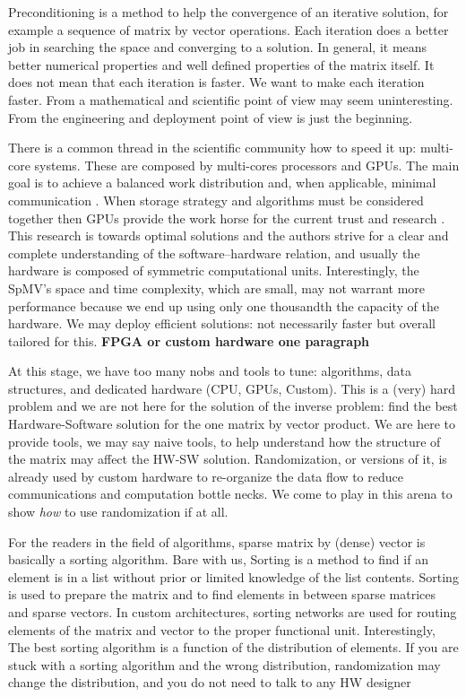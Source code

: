 \documentclass[manuscript,screen]{acmart}
\begin{document}
Preconditioning is a method to help the convergence of an iterative
solution, for example a sequence of matrix by vector operations.  Each
iteration does a better job in searching the space and converging to a
solution. In general, it means better numerical properties and well
defined properties of the matrix itself. It does not mean that each
iteration is faster.  We want to make each iteration faster. From a
mathematical and scientific point of view may seem uninteresting. From
the engineering and deployment point of view is just the beginning.

There is a common thread in the scientific community how to speed it
up: multi-core systems. These are composed by multi-cores processors
and GPUs. The main goal is to achieve a balanced work distribution
and, when applicable, minimal communication
\cite{DBLP:journals/siamsc/KayaaslanAU18,DBLP:conf/ieeehpcs/PageK18}. When
storage strategy and algorithms must be considered together then GPUs
provide the work horse for the current trust and research
\cite{DBLP:journals/topc/AnztCYDFNTTW20}. This research is towards
optimal solutions and the authors strive for a clear and complete
understanding of the software--hardware relation, and usually the
hardware is composed of symmetric computational units. Interestingly,
the SpMV's space and time complexity, which are small, may not warrant
more performance because we end up using only one thousandth the
capacity of the hardware. We may deploy efficient solutions: not
necessarily faster but overall tailored for this.  {\bf FPGA or custom
  hardware one paragraph }



At this stage, we have too many nobs and tools to tune: algorithms,
data structures, and dedicated hardware (CPU, GPUs, Custom). This is a
(very) hard problem and we are not here for the solution of the
inverse problem: find the best Hardware-Software solution for the one
matrix by vector product. We are here to provide tools, we may say
naive tools, to help understand how the structure of the matrix may
affect the HW-SW solution. Randomization, or versions of it, is
already used by custom hardware to re-organize the data flow to reduce
communications and computation bottle necks. We come to play in this
arena to show {\em how} to use randomization if at all.

For the readers in the field of algorithms, sparse matrix by (dense)
vector is basically a sorting algorithm. Bare with us, Sorting is a
method to find if an element is in a list without prior or limited
knowledge of the list contents. Sorting is used to prepare the matrix
and to find elements in between sparse matrices and sparse vectors. In
custom architectures, sorting networks are used for routing elements
of the matrix and vector to the proper functional unit. Interestingly,
The best sorting algorithm is a function of the distribution of
elements. If you are stuck with a sorting algorithm and the wrong
distribution, randomization may change the distribution, and you do
not need to talk to any HW designer
\end{document}

